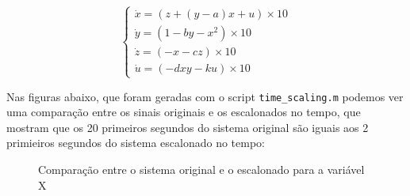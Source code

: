 \documentclass[12pt]{article}
\begin{document}
    \begin{equation}
        \left\{
            \begin{array}{l}
              \dot{x} = (z + (y - a)x + u)\times 10\\
              \dot{y} = (1 - by - x^2)\times 10\\
              \dot{z} = (-x - cz)\times 10\\
              \dot{u} = (-dxy - ku)\times 10
            \end{array}
          \right.
    \end{equation}

    Nas figuras abaixo, que foram geradas com o script \texttt{time\_scaling.m} podemos ver uma comparação entre os sinais originais e os escalonados no tempo, que mostram que os 20 primeiros segundos do sistema original são iguais aos 2 primieiros segundos do sistema escalonado no tempo:
    \begin{figure}[H]
        \caption{Comparação entre o sistema original e o escalonado para a variável X}
    \end{figure}
\end{document}

